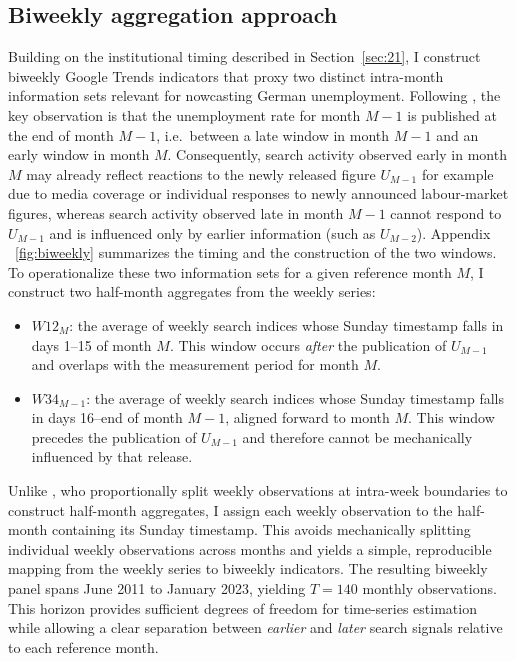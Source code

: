 \documentclass[12pt,a4paper]{article}
\begin{document}
\subsection{Biweekly aggregation approach}
\label{sec:biweekly_aggregation}
Building on the institutional timing described in Section~\ref{sec:21}, I construct biweekly Google Trends indicators that proxy two distinct intra-month information sets relevant for nowcasting German unemployment. Following \citet{Askitas}, the key observation is that the unemployment rate for month $M{-}1$ is published at the end of month $M{-}1$, i.e.\ between a late window in month $M{-}1$ and an early window in month $M$. Consequently, search activity observed early in month $M$ may already reflect reactions to the newly released figure $U_{M-1}$ for example due to media coverage or individual responses to newly announced labour-market figures, whereas search activity observed late in month $M{-}1$ cannot respond to $U_{M-1}$ and is influenced only by earlier information (such as $U_{M-2}$). Appendix ~\ref{fig:biweekly} summarizes the timing and the construction of the two windows.
To operationalize these two information sets for a given reference month $M$, I construct two half-month aggregates from the weekly series:
\begin{itemize}
    \item \textbf{$W12_M$}: the average of weekly search indices whose Sunday timestamp falls in days 1--15 of month $M$. This window occurs \emph{after} the publication of $U_{M-1}$ and overlaps with the measurement period for month $M$.
    \item \textbf{$W34_{M-1}$}: the average of weekly search indices whose Sunday timestamp falls in days 16--end of month $M{-}1$, aligned forward to month $M$. This window precedes the publication of $U_{M-1}$ and therefore cannot be mechanically influenced by that release.
\end{itemize}
Unlike \citet{Askitas}, who proportionally split weekly observations at intra-week boundaries to construct half-month aggregates, I assign each weekly observation to the half-month containing its Sunday timestamp.
This avoids mechanically splitting individual weekly observations across months and yields a simple, reproducible mapping from the weekly series to biweekly indicators.
The resulting biweekly panel spans June 2011 to January 2023, yielding $T = 140$ monthly observations. This horizon provides sufficient degrees of freedom for time-series estimation while allowing a clear separation between \emph{earlier} and \emph{later} search signals relative to each reference month. 
\end{document}
